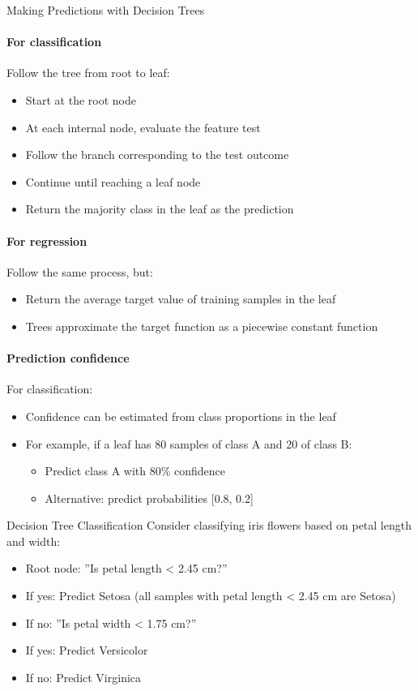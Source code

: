\begin{KR}{Making Predictions with Decision Trees}
\paragraph{For classification}
Follow the tree from root to leaf:
\begin{itemize}
    \item Start at the root node
    \item At each internal node, evaluate the feature test
    \item Follow the branch corresponding to the test outcome
    \item Continue until reaching a leaf node
    \item Return the majority class in the leaf as the prediction
\end{itemize}

\paragraph{For regression}
Follow the same process, but:
\begin{itemize}
    \item Return the average target value of training samples in the leaf
    \item Trees approximate the target function as a piecewise constant function
\end{itemize}

\paragraph{Prediction confidence}
For classification:
\begin{itemize}
    \item Confidence can be estimated from class proportions in the leaf
    \item For example, if a leaf has 80 samples of class A and 20 of class B:
    \begin{itemize}
        \item Predict class A with 80\% confidence
        \item Alternative: predict probabilities [0.8, 0.2]
    \end{itemize}
\end{itemize}
\end{KR}



\multend

\begin{example}{Decision Tree Classification}
Consider classifying iris flowers based on petal length and width:
\begin{itemize}
    \item Root node: ''Is petal length < 2.45 cm?''
    \item If yes: Predict Setosa (all samples with petal length < 2.45 cm are Setosa)
    \item If no: ''Is petal width < 1.75 cm?''
    \item If yes: Predict Versicolor
    \item If no: Predict Virginica
\end{itemize}
\end{example}

